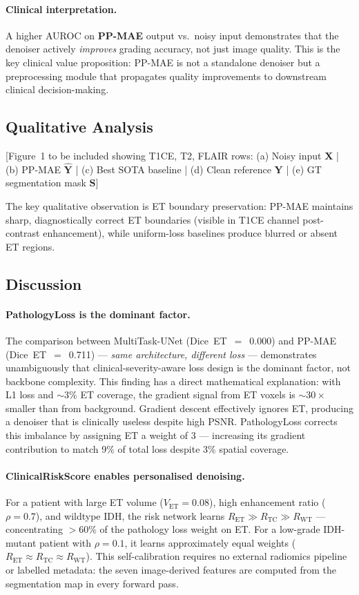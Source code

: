 \documentclass[runningheads]{llncs}
\newcommand{\ppmae}{\textbf{PP-MAE}}
\newcommand{\ET}{\text{ET}}
\newcommand{\TC}{\text{TC}}
\newcommand{\WT}{\text{WT}}
\begin{document}
\paragraph{Clinical interpretation.}
A higher AUROC on \ppmae{} output vs.\ noisy input demonstrates that
the denoiser actively \emph{improves} grading accuracy, not just
image quality. This is the key clinical value proposition: PP-MAE
is not a standalone denoiser but a preprocessing module that
propagates quality improvements to downstream clinical decision-making.

\subsection{Qualitative Analysis}

[Figure~1 to be included showing T1CE, T2, FLAIR rows:
 (a) Noisy input $\bm{X}$ |
 (b) PP-MAE $\hat{\bm{Y}}$ |
 (c) Best SOTA baseline |
 (d) Clean reference $\bm{Y}$ |
 (e) GT segmentation mask $\bm{S}$]

The key qualitative observation is ET boundary preservation:
PP-MAE maintains sharp, diagnostically correct ET boundaries
(visible in T1CE channel post-contrast enhancement), while
uniform-loss baselines produce blurred or absent ET regions.

\subsection{Discussion}

\paragraph{PathologyLoss is the dominant factor.}
The comparison between MultiTask-UNet (Dice~ET~$=$~0.000) and
PP-MAE (Dice~ET~$=$~0.711) — \emph{same architecture, different loss}
— demonstrates unambiguously that clinical-severity-aware loss design
is the dominant factor, not backbone complexity.
This finding has a direct mathematical explanation: with L1 loss and
${\sim}3$\% ET coverage, the gradient signal from ET voxels is
${\sim}30\times$ smaller than from background. Gradient descent
effectively ignores ET, producing a denoiser that is clinically
useless despite high PSNR.
PathologyLoss corrects this imbalance by assigning ET a weight of
3 — increasing its gradient contribution to match 9\% of total loss
despite 3\% spatial coverage.

\paragraph{ClinicalRiskScore enables personalised denoising.}
For a patient with large ET volume ($V_\ET{=}0.08$), high enhancement
ratio ($\rho{=}0.7$), and wildtype IDH, the risk network learns
$R_\ET \gg R_\TC \gg R_\WT$ — concentrating $>60$\% of the pathology
loss weight on ET. For a low-grade IDH-mutant patient with $\rho{=}0.1$,
it learns approximately equal weights ($R_\ET \approx R_\TC \approx R_\WT$).
This self-calibration requires no external radiomics pipeline or
labelled metadata: the seven image-derived features are computed
from the segmentation map in every forward pass.
\end{document}
